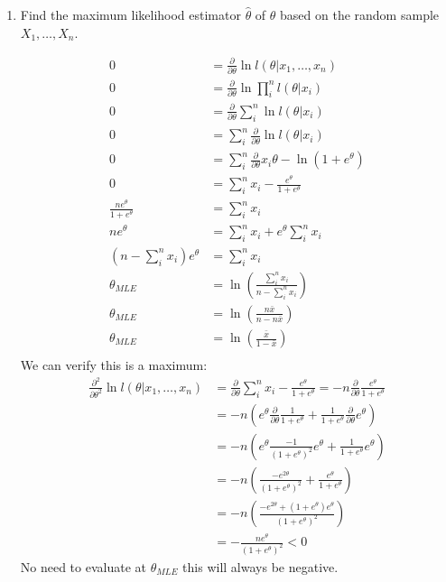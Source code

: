 \documentclass{article}
\newcommand{\1}{\mathbf{1}}
\begin{document}
\begin{enumerate}
    \newpage
    \item Find the maximum likelihood estimator $\hat{\theta}$ of $\theta$ based on the random sample $X_1,\ldots , X_n$.
    
    \begin{align*}
       0 &= \frac{\partial }{\partial\theta} \ln l(\theta | x_1,\hdots,x_n) \\
       0 &= \frac{\partial }{\partial\theta} \ln \prod_i^n l(\theta | x_i) \\
       0 &= \frac{\partial }{\partial\theta} \sum_i^n \ln l(\theta | x_i) \\
       0 &= \sum_i^n \frac{\partial }{\partial\theta}  \ln l(\theta | x_i) \\
       0 &= \sum_i^n \frac{\partial }{\partial\theta}  x_i\theta - \ln{(1+e^\theta)} \\
       0 &= \sum_i^n x_i - \frac{e^\theta}{1+e^\theta} \\
       \frac{ne^\theta}{1+e^\theta} &= \sum_i^n x_i \\
       ne^\theta &= \sum_i^n x_i + e^\theta\sum_i^n x_i \\
       \left(n - \sum_i^n x_i\right) e^\theta &= \sum_i^n x_i \\
       \theta_{MLE} &= \ln{\left( \frac{\sum_i^n x_i}{n - \sum_i^n x_i} \right)  } \\
       \theta_{MLE} &= \ln{\left( \frac{n\bar x}{n - n\bar x} \right)  } \\
       \theta_{MLE} &= \ln{\left( \frac{\bar x}{1 - \bar x} \right)  } \\
    \end{align*}
    We can verify this is a maximum:
    \begin{align*}
       \frac{\partial^2 }{\partial\theta^2} \ln l(\theta | x_1,\hdots,x_n) &= \frac{\partial }{\partial\theta}  \sum_i^n x_i - \frac{e^\theta}{1+e^\theta} = -n \frac{\partial }{\partial\theta} \frac{e^\theta}{1+e^\theta}  \\
        &= -n\left(e^\theta \frac{\partial}{\partial\theta} \frac{1}{1+e^\theta}  +  \frac{1}{1+e^\theta} \frac{\partial}{\partial\theta} e^\theta \right) \\
        &= -n\left(e^\theta \frac{-1}{(1+e^\theta)^2}e^\theta  +  \frac{1}{1+e^\theta} e^\theta \right) \\
        &= -n\left(\frac{-e^{2\theta}}{(1+e^\theta)^2}  +  \frac{e^\theta}{1+e^\theta}  \right) \\
        &= -n\left(\frac{-e^{2\theta} + (1+e^\theta)e^\theta}{(1+e^\theta)^2} \right) \\
        &= -\frac{ne^\theta}{(1+e^\theta)^2} < 0    
    \end{align*}
    No need to evaluate at $\theta_{MLE}$ this will always be negative. 
    

\end{enumerate}
\end{document}
